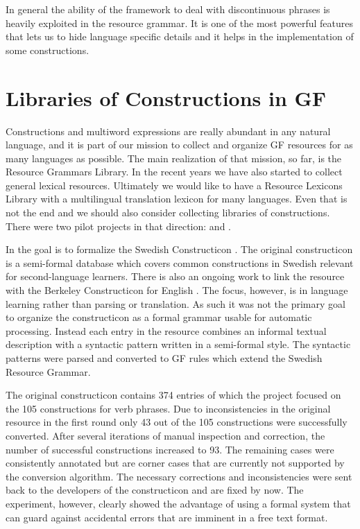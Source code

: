 \documentclass[output=paper]{LSP/langsci}
\begin{document}
In general the ability of the framework to deal with discontinuous phrases
is heavily exploited in the resource grammar. It is one of the most powerful
features that lets us to hide language specific details and it helps
in the implementation of some constructions.

\section{Libraries of Constructions in GF}

Constructions and multiword expressions are really abundant in 
any natural language, and it is part of our mission to collect and 
organize GF resources for as many languages as possible. The main
realization of that mission, so far, is the Resource Grammars Library.
In the recent years we have also started to collect general lexical
resources. Ultimately we would like to have a Resource Lexicons Library
with a multilingual translation lexicon for many languages.
Even that is not the end and we should also consider collecting libraries
of constructions. There were two pilot projects in that direction:
\cite{gruzitis2015formalising} and \cite{enache2014handling}.
 
In \cite{gruzitis2015formalising} the goal is to formalize the
Swedish Constructicon \citep{konvens:lyngfelt12w}. 
The original constructicon is a semi-formal 
database which covers common constructions in Swedish relevant for
second-language learners. There is also an ongoing work to link 
the resource with the Berkeley Constructicon for English \citep{backstrom}. The focus,
however, is in language learning rather than parsing or translation.
As such it was not the primary goal to organize the constructicon as
a formal grammar usable for automatic processing. Instead each entry
in the resource combines an informal textual description with 
a syntactic pattern written in a semi-formal style. 
The syntactic patterns were parsed and converted to GF rules
which extend the Swedish Resource Grammar.

The original constructicon contains 374 entries of which the project
focused on the 105 constructions for verb phrases. Due to inconsistencies
in the original resource in the first round only 43 out of 
the 105 constructions were successfully converted. 
After several iterations of manual inspection and correction, 
the number of successful constructions increased to 93. The remaining
cases were consistently annotated but are corner cases that are currently
not supported by the conversion algorithm. The necessary corrections
and inconsistencies were sent back to the developers of the constructicon
and are fixed by now. The experiment, however, clearly showed the advantage
of using a formal system that can guard against accidental errors
that are imminent in a free text format.
\end{document}

